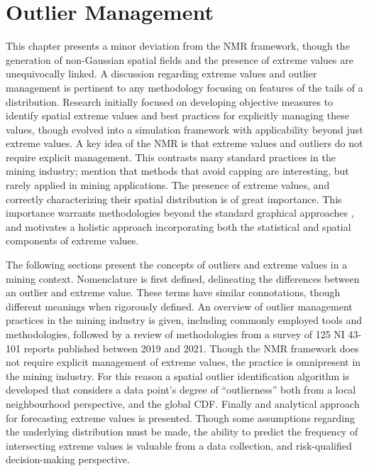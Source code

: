 
\chapter{Outlier Management}
\label{ch:02outlier}

This chapter presents a minor deviation from the \gls{NMR} framework, though the generation of non-Gaussian spatial fields and the presence of extreme values are unequivocally linked. A discussion regarding extreme values and outlier management is pertinent to any methodology focusing on features of the tails of a distribution. Research initially focused on developing objective measures to identify spatial extreme values and best practices for explicitly managing these values, though evolved into a simulation framework with applicability beyond just extreme values. A key idea of the \gls{NMR} is that extreme values and outliers do not require explicit management. This contrasts many standard practices in the mining industry; \cite{dutaut2021new} mention that methods that avoid capping are interesting, but rarely applied in mining applications. The presence of extreme values, and correctly characterizing their spatial distribution is of great importance. This importance warrants methodologies beyond the standard graphical approaches \citep{silva2021classification}, and motivates a holistic approach incorporating both the statistical and spatial components of extreme values.

The following sections present the concepts of outliers and extreme values in a mining context. Nomenclature is first defined, delineating the differences between an outlier and extreme value. These terms have similar connotations, though different meanings when rigorously defined. An overview of outlier management practices in the mining industry is given, including commonly employed tools and methodologies, followed by a review of methodologies from a survey of 125 \gls{NI} 43-101 reports published between 2019 and 2021. Though the \gls{NMR} framework does not require explicit management of extreme values, the practice is omnipresent in the mining industry. For this reason a spatial outlier identification algorithm is developed that considers a data point's degree of ``outlierness'' both from a local neighbourhood perspective, and the global \gls{CDF}. Finally and analytical approach for forecasting extreme values is presented.  Though some assumptions regarding the underlying distribution must be made, the ability to predict the frequency of intersecting extreme values is valuable from a data collection, and risk-qualified decision-making perspective.

